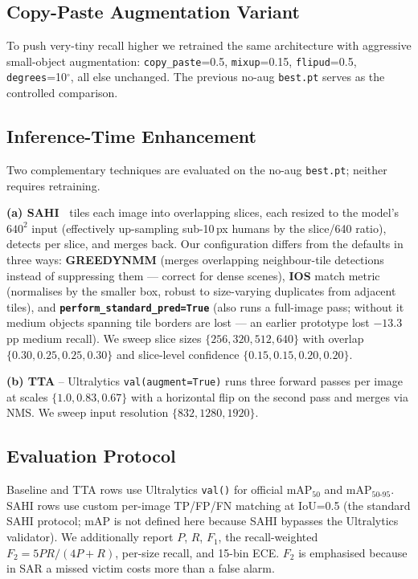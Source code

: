 \documentclass[11pt,a4paper]{article}
\begin{document}
\subsection{Copy-Paste Augmentation Variant}
To push very-tiny recall higher we retrained the same architecture
with aggressive small-object augmentation:
\texttt{copy\_paste}=0.5, \texttt{mixup}=0.15, \texttt{flipud}=0.5,
\texttt{degrees}=10$^{\circ}$, all else unchanged. The previous no-aug
\texttt{best.pt} serves as the controlled comparison.

\subsection{Inference-Time Enhancement}
Two complementary techniques are evaluated on the no-aug
\texttt{best.pt}; neither requires retraining.

\textbf{(a) SAHI~\cite{akyon2022sahi}} tiles each image into
overlapping slices, each resized to the model's $640^2$ input
(effectively up-sampling sub-10\,px humans by the slice/640 ratio),
detects per slice, and merges back. Our configuration differs from
the defaults in three ways: \textbf{GREEDYNMM} (merges overlapping
neighbour-tile detections instead of suppressing them — correct for
dense scenes), \textbf{IOS} match metric (normalises by the smaller
box, robust to size-varying duplicates from adjacent tiles), and
\textbf{\texttt{perform\_standard\_pred=True}} (also runs a full-image
pass; without it medium objects spanning tile borders are lost — an
earlier prototype lost $-13.3$ pp medium recall). We sweep slice sizes
$\{256,320,512,640\}$ with overlap $\{0.30,0.25,0.25,0.30\}$ and
slice-level confidence $\{0.15,0.15,0.20,0.20\}$.

\textbf{(b) TTA} -- Ultralytics \texttt{val(augment=True)} runs three
forward passes per image at scales $\{1.0,0.83,0.67\}$ with a
horizontal flip on the second pass and merges via NMS. We sweep input
resolution $\{832,1280,1920\}$.

\subsection{Evaluation Protocol}
Baseline and TTA rows use Ultralytics \texttt{val()} for official
mAP$_{50}$ and mAP$_{50\text{-}95}$. SAHI rows use custom per-image
TP/FP/FN matching at IoU=0.5 (the standard SAHI protocol; mAP is not
defined here because SAHI bypasses the Ultralytics validator). We
additionally report $P$, $R$, $F_1$, the recall-weighted
$F_2\!=\!5PR/(4P+R)$, per-size recall, and 15-bin ECE. $F_2$ is
emphasised because in SAR a missed victim costs more than a false
alarm.
\end{document}
